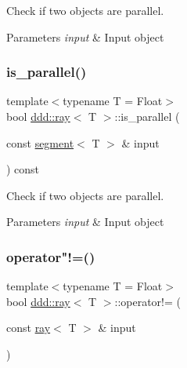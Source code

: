 Check if two objects are parallel. 


\begin{DoxyParams}{Parameters}
{\em input} & Input object \\
\hline
\end{DoxyParams}
\mbox{\label{classddd_1_1ray_add0ec87a055dcea770c010709092a651}} 
\subsubsection{\texorpdfstring{is\+\_\+parallel()}{is\_parallel()}\hspace{0.1cm}{\footnotesize\ttfamily [5/5]}}
{\footnotesize\ttfamily template$<$typename T = Float$>$ \\
bool \hyperlink{classddd_1_1ray}{ddd\+::ray}$<$ T $>$\+::is\+\_\+parallel (\begin{DoxyParamCaption}\item[{const \hyperlink{classddd_1_1segment}{segment}$<$ T $>$ \&}]{input }\end{DoxyParamCaption}) const\hspace{0.3cm}{\ttfamily [inline]}}



Check if two objects are parallel. 


\begin{DoxyParams}{Parameters}
{\em input} & Input object \\
\hline
\end{DoxyParams}
\mbox{\label{classddd_1_1ray_a8b119ad8700dddcff3fcdc45673456a4}} 
\subsubsection{\texorpdfstring{operator"!=()}{operator!=()}}
{\footnotesize\ttfamily template$<$typename T = Float$>$ \\
bool \hyperlink{classddd_1_1ray}{ddd\+::ray}$<$ T $>$\+::operator!= (\begin{DoxyParamCaption}\item[{const \hyperlink{classddd_1_1ray}{ray}$<$ T $>$ \&}]{input }\end{DoxyParamCaption})\hspace{0.3cm}{\ttfamily [inline]}}



